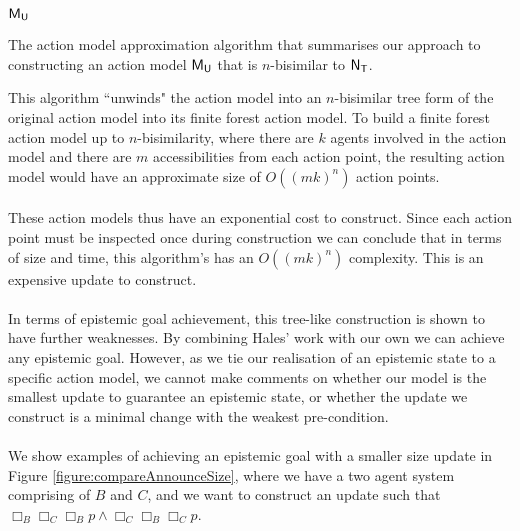 \begin{algorithm}
\begin{algorithmic}
    \FORALL {$\evt \in \evT$}
    \ENDFOR
    \RETURN $\mathrm{\mathsf{M}}_\mathrm{\mathsf{U}}$
\end{algorithmic}
\caption{The action model approximation algorithm that summarises our approach
to constructing an action model $\mathrm{\mathsf{M}}_\mathrm{\mathsf{U}}$ that is $n$-bisimilar to
$\mathrm{\mathsf{N}}_\mathrm{\mathsf{T}}$.}
\label{algo:myAlgo}
\end{algorithm}

This algorithm ``unwinds" the action model into an $n$-bisimilar tree form of the
original action model into its finite forest action model.
To build a finite forest action model up to $n$-bisimilarity, where there are
$k$ agents involved in the action model and there are $m$ accessibilities from
each action point, the resulting action model would have an approximate size of
$O((mk)^n)$ action points.\\
\\
These action models thus have an exponential cost to construct.
Since each action point must be inspected once during construction we can conclude that in
terms of size and time, this algorithm's has an $O((mk)^n)$ complexity.
This is an expensive update to construct.\\
\\
In terms of epistemic goal achievement, this tree-like construction is shown to
have further weaknesses.
By combining Hales' \cite{hales13synthesis} work with our own we can achieve any
epistemic goal.
However, as we tie our realisation of an epistemic state to a specific action
model, we cannot make comments on whether our model is the smallest update to
guarantee an epistemic state, or whether the update we construct is a minimal
change with the weakest pre-condition.\\
\\
We show examples of achieving an epistemic goal with a smaller size update in Figure
\ref{figure:compareAnnounceSize}, where we have a two agent system comprising of
$B$ and $C$, and we want to construct an update such that $\Box_B \Box_C \Box_B
p \land \Box_C \Box_B \Box_C p$.

